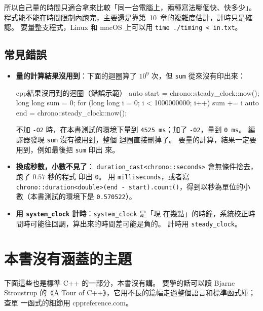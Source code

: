所以自己量的時間只適合拿來比較「同一台電腦上，兩種寫法哪個快、快多少」。
程式能不能在時間限制內跑完，主要還是靠第~10~章的複雜度估計，計時只是確認。
要量整支程式，Linux 和 macOS 上可以用 \texttt{time ./timing < in.txt}。

\subsection{常見錯誤}

\begin{itemize}
\item \textbf{量的計算結果沒用到}：下面的迴圈算了 $10^9$ 次，但
\texttt{sum} 從來沒有印出來：
\begin{code}{cpp}{結果沒用到的迴圈（錯誤示範）}
auto start = chrono::steady_clock::now();
long long sum = 0;
for (long long i = 0; i < 1000000000; i++) {
    sum += i %
}
auto end = chrono::steady_clock::now();
\end{code}
不加 \texttt{-O2} 時，在本書測試的環境下量到 \texttt{4525 ms}；加了
\texttt{-O2}，量到 \texttt{0 ms}。 編譯器發現 \texttt{sum} 沒有被用到，整個
迴圈直接刪掉了。 要量的計算，結果一定要用到，例如最後把 \texttt{sum} 印出
來。
\item \textbf{換成秒數，小數不見了}：
\texttt{duration\_cast<chrono::seconds>} 會無條件捨去，跑了 $0.57$ 秒的程式
印出 \texttt{0}。 用 \texttt{milliseconds}，或者寫
\texttt{chrono::duration<double>(end - start).count()}，得到以秒為單位的小
數（本書測試的環境下是 \texttt{0.570522}）。
\item \textbf{用 \texttt{system\_clock} 計時}：\texttt{system\_clock} 是「現
在幾點」的時鐘，系統校正時間時可能往回調，算出來的時間差可能是負的。 計時用
\texttt{steady\_clock}。
\end{itemize}

\section{本書沒有涵蓋的主題}
\label{sec:not-covered}

下面這些也是標準 C++ 的一部分，本書沒有講。 要學的話可以讀 Bjarne
Stroustrup 的《A Tour of C++》，它用不長的篇幅走過整個語言和標準函式庫；查單
一函式的細節用 cppreference.com。

